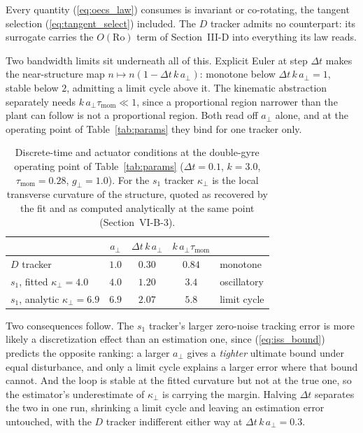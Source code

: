 Every quantity (\ref{eq:oecs_law}) consumes is invariant or co-rotating,
the tangent selection (\ref{eq:tangent_select}) included. The $D$
tracker admits no counterpart: its surrogate carries the
$O(\mathrm{Ro})$ term of Section~\mbox{III-D} into everything its law
reads.

Two bandwidth limits sit underneath all of this. Explicit Euler at step
$\Delta t$ makes the near-structure map $n \mapsto n(1 - \Delta t\,k\,
a_\perp)$: monotone below $\Delta t\,k\,a_\perp = 1$, stable below $2$,
admitting a limit cycle above it. The kinematic abstraction separately
needs $k\,a_\perp\tau_{\mathrm{mom}} \ll 1$, since a proportional region
narrower than the plant can follow is not a proportional region. Both
read off $a_\perp$ alone, and at the operating point of
Table~\ref{tab:params} they bind for one tracker only.

\begin{table}[!t]
\centering
\caption{Discrete-time and actuator conditions at the double-gyre
operating point of Table~\ref{tab:params} ($\Delta t = 0.1$, $k = 3.0$,
$\tau_{\mathrm{mom}} = 0.28$, $g_\perp = 1.0$). For the $s_1$ tracker
$\kappa_\perp$ is the local transverse curvature of the structure,
quoted as recovered by the fit and as computed analytically at the same
point (Section~\mbox{VI-B-3}).}
\label{tab:bandwidth}
\footnotesize
\setlength{\tabcolsep}{4pt}
\begin{tabular}{@{}lcccl@{}}
\hline
 & $a_\perp$ & $\Delta t\,k\,a_\perp$ &
 $k\,a_\perp\tau_{\mathrm{mom}}$ & \\
\hline
$D$ tracker & $1.0$ & $0.30$ & $0.84$ & monotone \\
$s_1$, fitted $\kappa_\perp = 4.0$ & $4.0$ & $1.20$ & $3.4$ & oscillatory \\
$s_1$, analytic $\kappa_\perp = 6.9$ & $6.9$ & $2.07$ & $5.8$ & limit cycle \\
\hline
\end{tabular}
\end{table}

Two consequences follow. The $s_1$ tracker's larger zero-noise tracking
error is more likely a discretization effect than an estimation one,
since (\ref{eq:iss_bound}) predicts the opposite ranking: a larger
$a_\perp$ gives a \emph{tighter} ultimate bound under equal disturbance,
and only a limit cycle explains a larger error where that bound cannot.
And the loop is stable at the fitted curvature but not at the true one,
so the estimator's underestimate of $\kappa_\perp$ is carrying the
margin. Halving $\Delta t$ separates the two in one run, shrinking a
limit cycle and leaving an estimation error untouched, with the $D$
tracker indifferent either way at $\Delta t\,k\,a_\perp = 0.3$.
